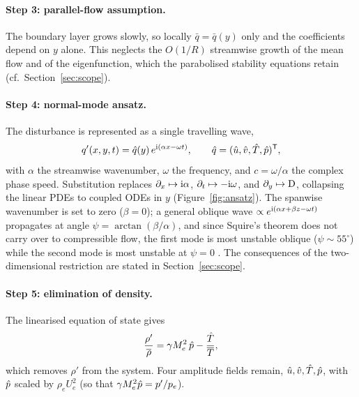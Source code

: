 \documentclass[11pt]{article}
\begin{document}
\paragraph{Step 3: parallel-flow assumption.} The boundary layer grows slowly, so locally
$\bar q=\bar q(y)$ only and the coefficients depend on $y$ alone. This neglects the $O(1/R)$ streamwise
growth of the mean flow and of the eigenfunction, which the parabolised stability equations retain
\cite{herbert1997} (cf.\ Section~\ref{sec:scope}).

\paragraph{Step 4: normal-mode ansatz.} The disturbance is represented as a single travelling wave,
\begin{equation}\label{eq:ansatz}
  q'(x,y,t)=\hat{q}(y)\,e^{\mathrm{i}(\alpha x-\omega t)},\qquad \hat{q}=(\hat{u},\hat{v},\hat{T},\hat{p})^{\mathsf T},
\end{equation}
with $\alpha$ the streamwise wavenumber, $\omega$ the frequency, and $c=\omega/\alpha$ the complex phase
speed. Substitution replaces $\partial_x\mapsto\mathrm{i}\alpha$, $\partial_t\mapsto-\mathrm{i}\omega$, and
$\partial_y\mapsto\mathrm{D}$, collapsing the linear PDEs to coupled ODEs in $y$
(Figure~\ref{fig:ansatz}). The spanwise wavenumber is set to zero ($\beta=0$); a general oblique wave
$\propto e^{\mathrm{i}(\alpha x+\beta z-\omega t)}$ propagates at angle $\psi=\arctan(\beta/\alpha)$, and
since Squire's theorem does not carry over to compressible flow, the first mode is most unstable oblique
($\psi\sim55^\circ$) while the second mode is most unstable at $\psi=0$ \cite{mack1984}. The
consequences of the two-dimensional restriction are stated in Section~\ref{sec:scope}.

\paragraph{Step 5: elimination of density.} The linearised equation of state gives
\begin{equation}\label{eq:state-lin}
  \frac{\rho'}{\overline{\rho}}=\gamma M_e^2\,\hat{p}-\frac{\hat{T}}{\overline{T}},
\end{equation}
which removes $\rho'$ from the system. Four amplitude fields remain, $\hat{u},\hat{v},\hat{T},\hat{p}$, with
$\hat{p}$ scaled by $\rho_eU_e^2$ (so that $\gamma M_e^2\hat{p}=p'/p_e$).
\end{document}
